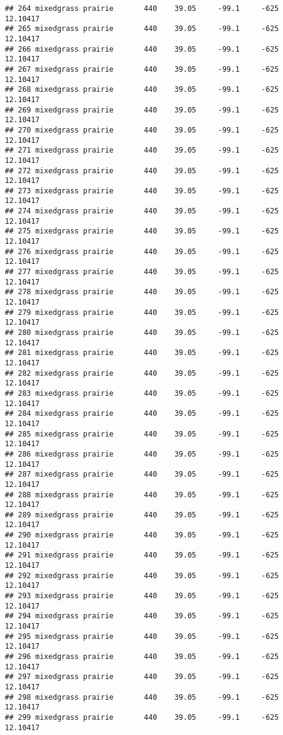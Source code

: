\documentclass[]{article}
\begin{document}
\begin{verbatim}
## 264 mixedgrass prairie       440    39.05     -99.1     -625 12.10417
## 265 mixedgrass prairie       440    39.05     -99.1     -625 12.10417
## 266 mixedgrass prairie       440    39.05     -99.1     -625 12.10417
## 267 mixedgrass prairie       440    39.05     -99.1     -625 12.10417
## 268 mixedgrass prairie       440    39.05     -99.1     -625 12.10417
## 269 mixedgrass prairie       440    39.05     -99.1     -625 12.10417
## 270 mixedgrass prairie       440    39.05     -99.1     -625 12.10417
## 271 mixedgrass prairie       440    39.05     -99.1     -625 12.10417
## 272 mixedgrass prairie       440    39.05     -99.1     -625 12.10417
## 273 mixedgrass prairie       440    39.05     -99.1     -625 12.10417
## 274 mixedgrass prairie       440    39.05     -99.1     -625 12.10417
## 275 mixedgrass prairie       440    39.05     -99.1     -625 12.10417
## 276 mixedgrass prairie       440    39.05     -99.1     -625 12.10417
## 277 mixedgrass prairie       440    39.05     -99.1     -625 12.10417
## 278 mixedgrass prairie       440    39.05     -99.1     -625 12.10417
## 279 mixedgrass prairie       440    39.05     -99.1     -625 12.10417
## 280 mixedgrass prairie       440    39.05     -99.1     -625 12.10417
## 281 mixedgrass prairie       440    39.05     -99.1     -625 12.10417
## 282 mixedgrass prairie       440    39.05     -99.1     -625 12.10417
## 283 mixedgrass prairie       440    39.05     -99.1     -625 12.10417
## 284 mixedgrass prairie       440    39.05     -99.1     -625 12.10417
## 285 mixedgrass prairie       440    39.05     -99.1     -625 12.10417
## 286 mixedgrass prairie       440    39.05     -99.1     -625 12.10417
## 287 mixedgrass prairie       440    39.05     -99.1     -625 12.10417
## 288 mixedgrass prairie       440    39.05     -99.1     -625 12.10417
## 289 mixedgrass prairie       440    39.05     -99.1     -625 12.10417
## 290 mixedgrass prairie       440    39.05     -99.1     -625 12.10417
## 291 mixedgrass prairie       440    39.05     -99.1     -625 12.10417
## 292 mixedgrass prairie       440    39.05     -99.1     -625 12.10417
## 293 mixedgrass prairie       440    39.05     -99.1     -625 12.10417
## 294 mixedgrass prairie       440    39.05     -99.1     -625 12.10417
## 295 mixedgrass prairie       440    39.05     -99.1     -625 12.10417
## 296 mixedgrass prairie       440    39.05     -99.1     -625 12.10417
## 297 mixedgrass prairie       440    39.05     -99.1     -625 12.10417
## 298 mixedgrass prairie       440    39.05     -99.1     -625 12.10417
## 299 mixedgrass prairie       440    39.05     -99.1     -625 12.10417

\end{verbatim}
\end{document}
